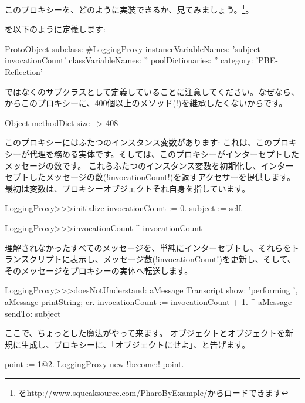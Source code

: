 \documentclass[a4paper,10pt,twoside]{book}
\begin{document}
このプロキシーを、どのように実装できるか、見てみましょう。\footnote{を\url{http://www.squeaksource.com/PharoByExample/}からロードできます}。

を以下のように定義します:
\begin{code}{}
ProtoObject subclass: #LoggingProxy
	instanceVariableNames: 'subject invocationCount'
	classVariableNames: ''
	poolDictionaries: ''
	category: 'PBE-Reflection'
\end{code}
ではなくのサブクラスとして定義していることに注意してください。なぜなら、からこのプロキシーに、400個以上のメソッド(!)を継承したくないからです。

\begin{code}{}
Object methodDict size --> 408
\end{code}

このプロキシーにはふたつのインスタンス変数があります:  これは、このプロキシーが代理を務める実体です。そしては、このプロキシーがインターセプトしたメッセージの数です。
これらふたつのインスタンス変数を初期化し、インターセプトしたメッセージの数(\ct!invocationCount!)を返すアクセサーを提供します。
最初は変数は、プロキシーオブジェクトそれ自身を指しています。
\begin{code}{}
LoggingProxy>>>initialize
	invocationCount := 0.
	subject := self.
\end{code}

\begin{code}{}
LoggingProxy>>>invocationCount
	^ invocationCount
\end{code}

理解されなかったすべてのメッセージを、単純にインターセプトし、それらをトランスクリプトに表示し、メッセージ数(\ct!invocationCount!)を更新し、そして、そのメッセージをプロキシーの実体へ転送します。
\begin{code}{}
LoggingProxy>>>doesNotUnderstand: aMessage 
	Transcript show: 'performing ', aMessage printString; cr.
	invocationCount := invocationCount + 1.
	^ aMessage sendTo: subject
\end{code}

ここで、ちょっとした魔法がやって来ます。
オブジェクトとオブジェクトを新規に生成し、プロキシーに、「オブジェクトにせよ」、と告げます。
\begin{code}{}
point := 1@2.
LoggingProxy new !\underline{become:}! point.
\end{code}
\end{document}
